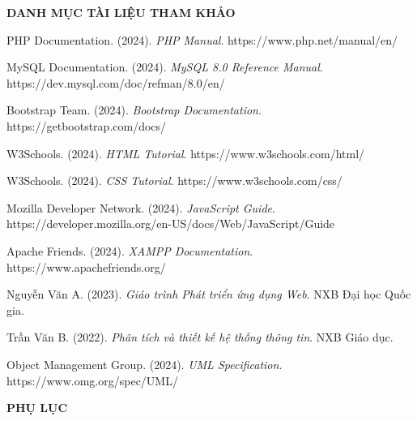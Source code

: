 \documentclass[a4paper,12pt]{report}
\begin{document}
\newpage
{}
\begin{center}
\textbf{\Large DANH MỤC TÀI LIỆU THAM KHẢO}
\end{center}
\vspace{1cm}

\begin{enumerate}[label={[\arabic*]}]
    \item PHP Documentation. (2024). \textit{PHP Manual}. https://www.php.net/manual/en/
    
    \item MySQL Documentation. (2024). \textit{MySQL 8.0 Reference Manual}. https://dev.mysql.com/doc/refman/8.0/en/
    
    \item Bootstrap Team. (2024). \textit{Bootstrap Documentation}. https://getbootstrap.com/docs/
    
    \item W3Schools. (2024). \textit{HTML Tutorial}. https://www.w3schools.com/html/
    
    \item W3Schools. (2024). \textit{CSS Tutorial}. https://www.w3schools.com/css/
    
    \item Mozilla Developer Network. (2024). \textit{JavaScript Guide}. https://developer.mozilla.org/en-US/docs/Web/JavaScript/Guide
    
    \item Apache Friends. (2024). \textit{XAMPP Documentation}. https://www.apachefriends.org/
    
    \item Nguyễn Văn A. (2023). \textit{Giáo trình Phát triển ứng dụng Web}. NXB Đại học Quốc gia.
    
    \item Trần Văn B. (2022). \textit{Phân tích và thiết kế hệ thống thông tin}. NXB Giáo dục.
    
    \item Object Management Group. (2024). \textit{UML Specification}. https://www.omg.org/spec/UML/
\end{enumerate}

\newpage
{}
\begin{center}
\textbf{\Large PHỤ LỤC}
\end{center}
\vspace{1cm}
\end{document}
